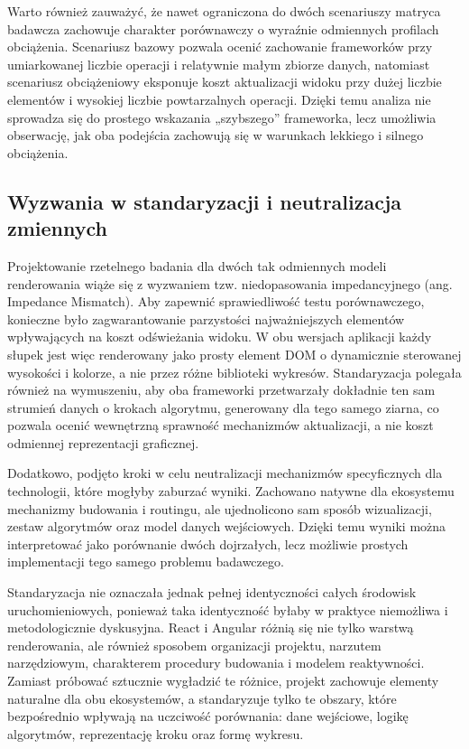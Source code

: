 \documentclass[12pt,openright,twoside]{report}
\begin{document}
Warto również zauważyć, że nawet ograniczona do dwóch scenariuszy matryca badawcza zachowuje charakter porównawczy o wyraźnie odmiennych profilach obciążenia. Scenariusz bazowy pozwala ocenić zachowanie frameworków przy umiarkowanej liczbie operacji i relatywnie małym zbiorze danych, natomiast scenariusz obciążeniowy eksponuje koszt aktualizacji widoku przy dużej liczbie elementów i wysokiej liczbie powtarzalnych operacji. Dzięki temu analiza nie sprowadza się do prostego wskazania „szybszego” frameworka, lecz umożliwia obserwację, jak oba podejścia zachowują się w warunkach lekkiego i silnego obciążenia.

\subsection{Wyzwania w standaryzacji i neutralizacja zmiennych}
Projektowanie rzetelnego badania dla dwóch tak odmiennych modeli renderowania wiąże się z wyzwaniem tzw. niedopasowania impedancyjnego (ang. Impedance Mismatch). Aby zapewnić sprawiedliwość testu porównawczego, konieczne było zagwarantowanie parzystości najważniejszych elementów wpływających na koszt odświeżania widoku. W obu wersjach aplikacji każdy słupek jest więc renderowany jako prosty element DOM o dynamicznie sterowanej wysokości i kolorze, a nie przez różne biblioteki wykresów. Standaryzacja polegała również na wymuszeniu, aby oba frameworki przetwarzały dokładnie ten sam strumień danych o krokach algorytmu, generowany dla tego samego ziarna, co pozwala ocenić wewnętrzną sprawność mechanizmów aktualizacji, a nie koszt odmiennej reprezentacji graficznej.

Dodatkowo, podjęto kroki w celu neutralizacji mechanizmów specyficznych dla technologii, które mogłyby zaburzać wyniki. Zachowano natywne dla ekosystemu mechanizmy budowania i routingu, ale ujednolicono sam sposób wizualizacji, zestaw algorytmów oraz model danych wejściowych. Dzięki temu wyniki można interpretować jako porównanie dwóch dojrzałych, lecz możliwie prostych implementacji tego samego problemu badawczego.

Standaryzacja nie oznaczała jednak pełnej identyczności całych środowisk uruchomieniowych, ponieważ taka identyczność byłaby w praktyce niemożliwa i metodologicznie dyskusyjna. React i Angular różnią się nie tylko warstwą renderowania, ale również sposobem organizacji projektu, narzutem narzędziowym, charakterem procedury budowania i modelem reaktywności. Zamiast próbować sztucznie wygładzić te różnice, projekt zachowuje elementy naturalne dla obu ekosystemów, a standaryzuje tylko te obszary, które bezpośrednio wpływają na uczciwość porównania: dane wejściowe, logikę algorytmów, reprezentację kroku oraz formę wykresu.
\end{document}
